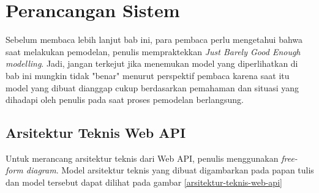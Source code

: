 \documentclass[a4paper, 12pt, oneside]{report}
\begin{document}
\chapter{Perancangan Sistem}

\onehalfspacing Sebelum membaca lebih lanjut bab ini, para pembaca perlu mengetahui bahwa saat melakukan pemodelan, penulis mempraktekkan \textit{Just Barely Good Enough modelling}\cite{jbge-scott}. Jadi, jangan terkejut jika menemukan model yang diperlihatkan di bab ini mungkin tidak "benar" menurut perspektif pembaca karena saat itu model yang dibuat dianggap cukup berdasarkan pemahaman dan situasi yang dihadapi oleh penulis pada saat proses pemodelan berlangsung.

\section{Arsitektur Teknis Web API}

Untuk merancang arsitektur teknis dari Web API, penulis menggunakan \textit{free-form diagram}. Model arsitektur teknis yang dibuat digambarkan pada papan tulis dan model tersebut dapat dilihat pada gambar \ref{arsitektur-teknis-web-api}

\newpage
\end{document}
